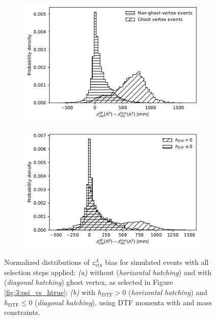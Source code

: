 \begin{figure}[t]
	\centering
	\begin{subfigure}{.45\textwidth}
		\includegraphics[width=\textwidth]{graphics/03-vertex_reconstruction/lambda_endvertex_z_bias_vs_ghost_vertex.pdf}
		\caption{}
		\label{fig:3:bias_without_ghost_vertex}
	\end{subfigure}
	\begin{subfigure}{.45\textwidth}
		\includegraphics[width=\textwidth]{graphics/03-vertex_reconstruction/lambda_endvertex_z_bias_vs_reco_horizontality.pdf}
		\caption{}
		\label{fig:3:bias_without_positive_hDTF}
	\end{subfigure}
	\caption{Normalized distributions of $z_\text{vtx}^\Lambda$ bias for simulated \demonstratorshort events with all selection steps applied: \textit{(a)} without (\textit{horizontal hatching}) and with (\textit{diagonal hatching}) \lz ghost vertex, as selected in Figure \ref{fig:3:psi_vs_htrue}; \textit{(b)} with $h_\text{DTF} > 0$ (\textit{horizontal hatching}) and  $h_\text{DTF} \leq 0$ (\textit{diagonal hatching}), using DTF momenta with \jpsi and \lz mass constraints.}
	\label{fig:3:bias_in_isolated_events}
\end{figure}

